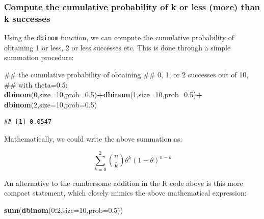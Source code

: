 \documentclass[12pt,]{krantz}
\newenvironment{Shaded}{\begin{snugshade}}{\end{snugshade}}
\newcommand{\KeywordTok}[1]{\textcolor[rgb]{0.13,0.29,0.53}{\textbf{#1}}}
\newcommand{\DataTypeTok}[1]{\textcolor[rgb]{0.13,0.29,0.53}{#1}}
\newcommand{\DecValTok}[1]{\textcolor[rgb]{0.00,0.00,0.81}{#1}}
\newcommand{\FloatTok}[1]{\textcolor[rgb]{0.00,0.00,0.81}{#1}}
\newcommand{\StringTok}[1]{\textcolor[rgb]{0.31,0.60,0.02}{#1}}
\newcommand{\OperatorTok}[1]{\textcolor[rgb]{0.81,0.36,0.00}{\textbf{#1}}}
\newcommand{\NormalTok}[1]{#1}
\theoremstyle{definition}
\theoremstyle{definition}
\theoremstyle{definition}
\theoremstyle{remark}
\begin{document}
\subsubsection{Compute the cumulative probability of k or less (more)
than k
successes}\label{compute-the-cumulative-probability-of-k-or-less-more-than-k-successes}

Using the \texttt{dbinom} function, we can compute the cumulative
probability of obtaining 1 or less, 2 or less successes etc. This is
done through a simple summation procedure:

\begin{Shaded}
\begin{Highlighting}[]
\NormalTok{## the cumulative probability of obtaining}
\NormalTok{## 0, 1, or 2 successes out of 10,}
\NormalTok{## with theta=0.5:}
\KeywordTok{dbinom}\NormalTok{(}\DecValTok{0}\NormalTok{,}\DataTypeTok{size=}\DecValTok{10}\NormalTok{,}\DataTypeTok{prob=}\FloatTok{0.5}\NormalTok{)}\OperatorTok{+}\KeywordTok{dbinom}\NormalTok{(}\DecValTok{1}\NormalTok{,}\DataTypeTok{size=}\DecValTok{10}\NormalTok{,}\DataTypeTok{prob=}\FloatTok{0.5}\NormalTok{)}\OperatorTok{+}
\StringTok{  }\KeywordTok{dbinom}\NormalTok{(}\DecValTok{2}\NormalTok{,}\DataTypeTok{size=}\DecValTok{10}\NormalTok{,}\DataTypeTok{prob=}\FloatTok{0.5}\NormalTok{)}
\end{Highlighting}
\end{Shaded}

\begin{verbatim}
## [1] 0.0547
\end{verbatim}

Mathematically, we could write the above summation as:

\begin{equation}
\sum_{k=0}^2 \binom{n}{k} \theta^{k} (1-\theta)^{n-k} 
\end{equation}

An alternative to the cumbersome addition in the R code above is this
more compact statement, which closely mimics the above mathematical
expression:

\begin{Shaded}
\begin{Highlighting}[]
\KeywordTok{sum}\NormalTok{(}\KeywordTok{dbinom}\NormalTok{(}\DecValTok{0}\OperatorTok{:}\DecValTok{2}\NormalTok{,}\DataTypeTok{size=}\DecValTok{10}\NormalTok{,}\DataTypeTok{prob=}\FloatTok{0.5}\NormalTok{))}
\end{Highlighting}
\end{Shaded}
\end{document}
